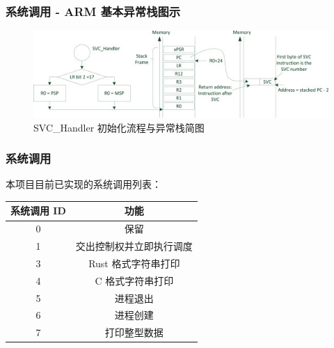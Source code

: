 \documentclass[aspectratio=169]{beamer}
\begin{document}
\begin{frame}

    \frametitle{系统调用 - ARM 基本异常栈图示}

    \begin{figure}
    \centering
        \captionsetup{font=song}
        \includegraphics{3-s2.0-B9780124080829000105-f10-05-9780124080829.jpg}
        \caption{SVC\_Handler 初始化流程与异常栈简图}
    \end{figure}

\end{frame}

\begin{frame}
    \frametitle{系统调用}

    本项目目前已实现的系统调用列表：

    \begin{center}
        \begin{tabular}{ |c|c| }
            \hline
            \textbf{系统调用 ID} & \textbf{功能} \\ \hline
            0 & 保留 \\
            1 & 交出控制权并立即执行调度 \\
            3 & Rust 格式字符串打印 \\ 
            4 & C 格式字符串打印 \\
            5 & 进程退出 \\
            6 & 进程创建 \\
            7 & 打印整型数据 \\ \hline
        \end{tabular}
    \end{center}
    
\end{frame}
\end{document}
